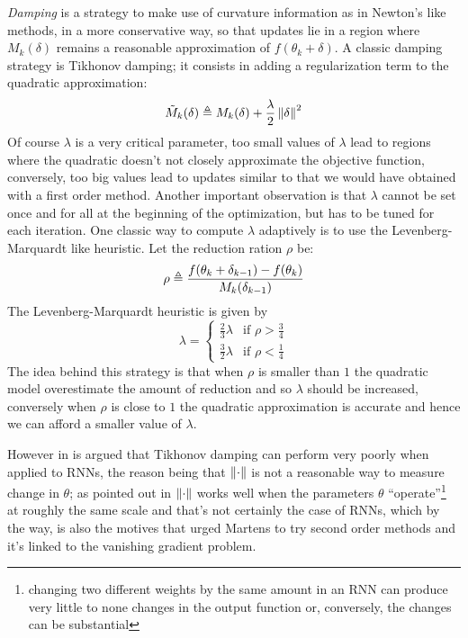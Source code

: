 \textit{Damping} is a strategy to make use of curvature information as in Newton's like methods, in a more conservative way, so that updates lie in a region where $M_k(\delta)$ remains a reasonable approximation of $f(\theta_k+\delta)$. 
A classic damping strategy is Tikhonov damping; it consists in adding a regularization term to the quadratic approximation:
\begin{equation}
 \tilde{M}_k(\delta) \triangleq  M_k(\delta) + \frac{\lambda}{2} \left\Vert \delta \right\Vert^2
\end{equation}
Of course $\lambda$ is a very critical parameter, too small values of $\lambda$ lead to regions where the quadratic doesn't not closely approximate the objective function, conversely, too big values lead to updates similar to that we would have obtained with a first order method. Another important observation is that $\lambda$ cannot be set once and for all at the beginning of the optimization, but has to be tuned for each iteration. One classic way to compute $\lambda$ adaptively is to use the Levenberg-Marquardt like heuristic.
Let the reduction ration $\rho$ be:
\begin{equation}
 \rho \triangleq \frac{f(\theta_k + \delta_{k-1})-f(\theta_k)}{M_k(\delta_{k-1})}
\end{equation}
The Levenberg-Marquardt  heuristic is given by
\begin{equation} 
 \lambda = 
 \begin{cases} 
    \frac{2}{3}\lambda &\mbox{if } \rho > \frac{3}{4} \\ 
    \frac{3}{2}\lambda &\mbox{if } \rho < \frac{1}{4} 
  \end{cases} 
\end{equation}
The idea behind this strategy is that when $\rho$ is smaller than $1$ the quadratic model overestimate the amount of reduction and so $\lambda$ should be increased, conversely when $\rho$ is close to $1$ the quadratic approximation is accurate and hence we can afford a smaller value of $\lambda$.

However in \cite{hessianFree} is argued that Tikhonov damping can perform very poorly when applied to RNNs, the reason being that $\left\Vert \cdot \right\Vert$ is not a reasonable way to measure change in $\theta$; as pointed out in \cite{hessianFree} $\left\Vert \cdot \right\Vert$ works well when the parameters $\theta$ ``operate''\footnote{changing two different weights by the same amount in an RNN can produce very little to none changes in the output function or, conversely, the changes can be substantial} at roughly the same scale and that's not certainly the case of RNNs, which by the way, is also the motives that urged Martens to try second order methods and it's linked to the vanishing gradient problem. 

